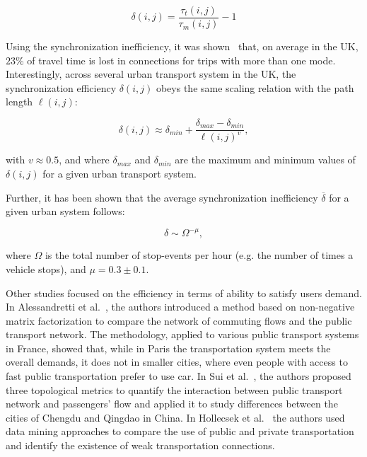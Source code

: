 \begin{equation}
    \delta(i,j)=\frac{\tau_t(i,j)}{\tau_m(i,j)}-1
\end{equation}

Using the synchronization inefficiency, it was shown~\cite{Gallotti2014Efficiency} that, on average in the UK, $23\%$ of travel time is lost in connections for trips with more than one mode. Interestingly, across several urban transport system in the UK, the synchronization efficiency $\delta(i,j)$ obeys the same scaling relation with the path length $\ell(i,j)$:

\begin{equation} \label{eq:deltaSynchronization}
    \delta(i,j) \approx \delta_{\textit{min}}+\frac{\delta_{\textit{max}}-\delta_{\textit{min}}}{\ell(i,j)^v},
\end{equation}

with $v \approx 0.5$, and where $\delta_{\textit{max}}$ and $\delta_{\textit{min}}$ are the maximum and minimum values of $\delta(i,j)$ for a given urban transport system.

Further, it has been shown that the average synchronization inefficiency $\overline{\delta}$ for a given urban system follows: 

\begin{equation}
   \delta \sim \Omega^{-\mu},
\end{equation}

where $\Omega$ is the total number of stop-events per hour (e.g. the number of times a vehicle stops), and $\mu = 0.3 \pm 0.1$.

Other studies focused on the efficiency in terms of ability to satisfy users demand. In Alessandretti et al.~\cite{alessandretti2016user}, the authors introduced a method based on non-negative matrix factorization to compare the network of commuting flows and the public transport network. The methodology, applied to various public transport systems in France, showed that, while in Paris the transportation system meets the overall demands, it does not in smaller cities, where even people with access to fast public transportation prefer to use car. In Sui et al.~\cite{sui2019publictransport}, the authors proposed three topological metrics to quantify the interaction between public transport network and passengers’ flow and applied it to study differences between the cities of Chengdu and Qingdao in China. In Hollecsek et al.~\cite{holleczek2014detecting} the authors used data mining approaches to compare the use of public and private transportation and identify the existence of weak transportation connections.
 
